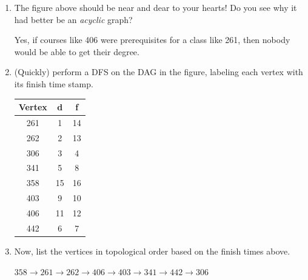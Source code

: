 \documentclass[12pt]{article}
\begin{document}
\begin{enumerate}
\item The figure above should be near and dear to your hearts! Do you
see why it had better be an {\em acyclic} graph?

Yes, if courses like 406 were prerequisites for a class like 261, then nobody would be able to get their degree.

\item (Quickly) perform a DFS on the DAG in the figure, labeling each
vertex with its finish time stamp.

\begin{center}
    \begin{tabular}{|c|c|c|}
     \hline \textbf{Vertex} & \textbf{d} & \textbf{f} \\
     \hline 261 & 1 & 14 \\
     \hline 262 & 2 & 13 \\
     \hline 306 & 3 & 4 \\
     \hline 341 & 5 & 8 \\
     \hline 358 & 15 & 16 \\
     \hline 403 & 9 & 10 \\
     \hline 406 & 11 & 12 \\
     \hline 442 & 6 & 7 \\
     \hline
    \end{tabular}
\end{center}

\item Now, list the vertices in topological order based on the finish 
times above. 

$358 \to{} 261 \to{} 262 \to{} 406 \to{} 403 \to{} 341 \to{} 442 \to{} 306$
\end{enumerate}
\end{document}
